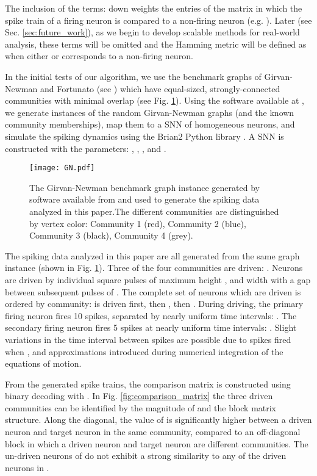 \documentclass[sigconf]{acmart}
\begin{document}
The inclusion of the terms:  down weights the entries of the matrix  in which the spike train of a firing neuron is compared to a non-firing neuron (e.g. ). Later (see Sec. \ref{sec:future_work}), as we begin to develop scalable methods for real-world analysis, these terms will be omitted and the Hamming metric will be defined as  when either  or  corresponds to a non-firing neuron.

In the initial tests of our algorithm, we use the benchmark graphs of Girvan-Newman and Fortunato (see \cite{girvan2002community,newman2004finding,lancichinetti2008benchmark,lancichinetti2009benchmarks}) which have equal-sized, strongly-connected communities with minimal overlap (see Fig. \ref{fig:girvan_newman_graph}). Using the software available at \cite{fortunato_site}, we generate instances of the random Girvan-Newman graphs (and the known community memberships), map them to a SNN of homogeneous neurons, and simulate the spiking dynamics using the Brian2 Python library \cite{goodman2008brian}.  A SNN is constructed with the parameters: , , ,  and . 

\begin{figure}
\texttt{[image: GN.pdf]}
\caption{The Girvan-Newman benchmark graph instance generated by software available from \cite{fortunato_site} and used to generate the spiking data analyzed in this paper.The different communities are distinguished by vertex color: Community 1 (red), Community 2 (blue), Community 3 (black), Community 4 (grey).}
\label{fig:girvan_newman_graph}
\end{figure}


The spiking data analyzed in this paper are all generated from the same graph instance (shown in Fig. \ref{fig:girvan_newman_graph}). Three of the four communities are driven: .  Neurons are driven by individual square pulses of maximum height , and width  with a gap between subsequent pulses of . The complete set of neurons which are driven is ordered by community:  is driven first, then , then . During driving, the primary firing neuron fires 10 spikes, separated by nearly uniform time intervals: . The secondary firing neuron fires 5 spikes at nearly uniform time intervals: . Slight variations in the time interval between spikes are possible due to spikes fired when , and approximations introduced during numerical integration of the equations of motion.

From the generated spike trains, the comparison matrix is constructed using binary decoding with . In Fig. \ref{fig:comparison_matrix} the three driven communities can be identified by the magnitude of  and the block matrix structure. Along the diagonal, the value of  is significantly higher between a driven neuron  and target neuron  in the same community, compared to an off-diagonal block in which a driven neuron  and target neuron  are different communities. The un-driven neurons of  do not exhibit a strong similarity to any of the driven neurons in .
\end{document}
